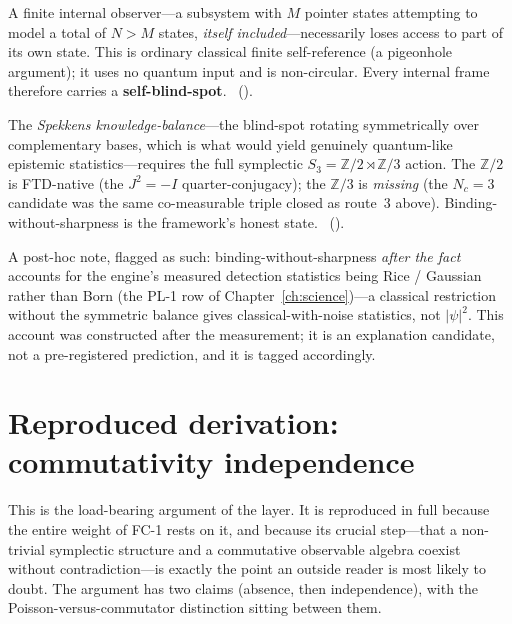 \begin{description}[leftmargin=1.4em,itemsep=4pt]
\item[The binding half.] A finite internal observer---a subsystem with $M$
  pointer states attempting to model a total of $N>M$ states, \emph{itself
  included}---necessarily loses access to part of its own state. This is
  ordinary classical finite self-reference (a pigeonhole argument); it uses no
  quantum input and is non-circular. Every internal frame therefore carries a
  \textbf{self-blind-spot}. ~().
\item[The sharp half.] The \emph{Spekkens knowledge-balance}---the blind-spot
  rotating symmetrically over complementary bases, which is what would yield
  genuinely quantum-like epistemic statistics---requires the full symplectic
  $S_3 = \mathbb{Z}/2 \rtimes \mathbb{Z}/3$ action. The $\mathbb{Z}/2$ is
  FTD-native (the $J^2=-I$ quarter-conjugacy); the $\mathbb{Z}/3$ is
  \emph{missing} (the $N_c=3$ candidate was the same co-measurable triple closed
  as route~3 above). Binding-without-sharpness is the framework's honest state.
  ~().
\end{description}

\noindent
A post-hoc note, flagged as such: binding-without-sharpness \emph{after the
fact} accounts for the engine's measured detection statistics being Rice /
Gaussian rather than Born (the PL-1 row of Chapter~\ref{ch:science})---a classical
restriction without the symmetric balance gives classical-with-noise statistics,
not $|\psi|^2$. This account was constructed after the measurement; it is an
explanation candidate, not a pre-registered prediction, and it is tagged
accordingly.

\section{Reproduced derivation: commutativity independence}\label{sec:derivation}

This is the load-bearing argument of the layer. It is reproduced in full because
the entire weight of FC-1 rests on it, and because its crucial step---that a
non-trivial symplectic structure and a commutative observable algebra coexist
without contradiction---is exactly the point an outside reader is most likely to
doubt. The argument has two claims (absence, then independence), with the
Poisson-versus-commutator distinction sitting between them.

